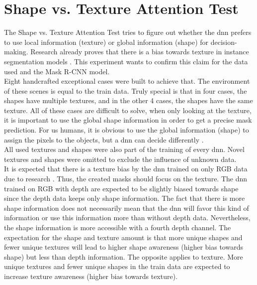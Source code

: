 	\section{Shape vs. Texture Attention Test}
	\label{sec:shape-texutre-attention-test}
		The Shape vs. Texture Attention Test tries to figure out whether the \ac{dnn} prefers to use local information (texture) or global information (shape) for decision-making. Research already proves that there is a bias towards texture in instance segmentation models \cite{Theodoridis2022}. This experiment wants to confirm this claim for the data used and the Mask R-CNN model.\\
		Eight handcrafted exceptional cases were built to achieve that. The environment of these scenes is equal to the train data. Truly special is that in four cases, the shapes have multiple textures, and in the other 4 cases, the shapes have the same texture. All of these cases are difficult to solve, when only looking at the texture, it is important to use the global shape information in order to get a precise mask prediction. For us humans, it is obvious to use the global information (shape) to assign the pixels to the objects, but a \ac{dnn} can decide differently \cite{Geirhos2020}\cite{Mohla2022}\cite{Baker2020}.\\
		All used textures and shapes were also part of the training of every \ac{dnn}. Novel textures and shapes were omitted to exclude the influence of unknown data.\\
		It is expected that there is a texture bias by the \ac{dnn} trained on only RGB data due to research \cite{Theodoridis2022}. Thus, the created masks should focus on the texture.
		The \ac{dnn} trained on RGB with depth are expected to be slightly biased towards shape since the depth data keeps only shape information. The fact that there is more shape information does not necessarily mean that the \ac{dnn} will favor this kind of information or use this information more than without depth data. Nevertheless, the shape information is more accessible with a fourth depth channel.%
		The expectation for the shape and texture amount is that more unique shapes and fewer unique textures will lead to higher shape awareness (higher bias towards shape) but less than depth information. The opposite applies to texture. More unique textures and fewer unique shapes in the train data are expected to increase texture awareness (higher bias towards texture). \\
